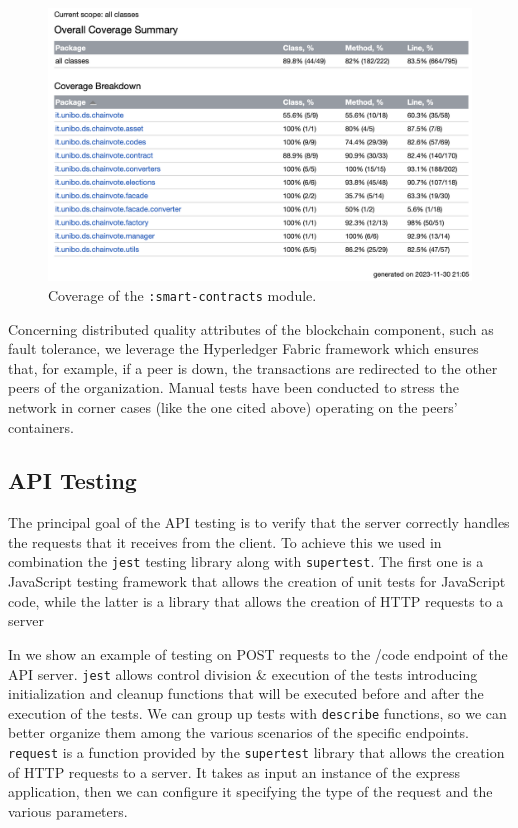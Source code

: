 \documentclass{scrartcl}
\begin{document}
\begin{figure}
    \centering
    \includegraphics[width=\linewidth]{figures/smart-contracts-coverage.png}
    \caption{Coverage of the \texttt{:smart-contracts} module.}
    \label{fig:smart-contracts-coverage} 
\end{figure}

Concerning distributed quality attributes of the blockchain component, such as fault tolerance, we leverage the Hyperledger Fabric framework which ensures that, for example, if a peer is down, the transactions are redirected to the other peers of the organization.
%
Manual tests have been conducted to stress the network in corner cases (like the one cited above) operating on the peers' containers.

\subsection{API Testing}
The principal goal of the API testing is to verify that the server correctly handles the requests that it receives from the client. To achieve this we used in combination the \texttt{jest} testing library along with \texttt{supertest}. The first one is a JavaScript testing framework that allows the creation of unit tests for JavaScript code, while the latter is a library that allows the creation of HTTP requests to a server


In  we show an example of testing on POST requests to the /code endpoint of the API server. \texttt {jest} allows control division \& execution of the tests introducing initialization and cleanup functions that will be executed before and after the execution of the tests. 
We can group up tests with \texttt{describe} functions, so we can better organize them among the various scenarios of the specific endpoints.
\texttt{request} is a function provided by the \texttt{supertest} library that allows the creation of HTTP requests to a server. It takes as input an instance of the express application, then we can configure it specifying the type of the request and the various parameters.
\end{document}
